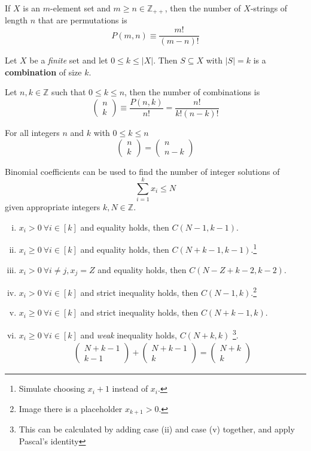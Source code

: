 \documentclass{article}
\def\Z{{\mathbb Z}}
\newcommand{\bi}[2]{\begin{pmatrix}{#1}\\{#2}\end{pmatrix}}
\begin{document}
			\begin{proposition}
				If $X$ is an $m$-element set and $m \geq n \in \Z_{++}$, then the number of $X$-strings of length $n$ that are permutations is 
				\begin{equation}
					P(m, n) \equiv \frac{m!}{(m-n)!}
				\end{equation}
			\end{proposition}
			
			\begin{definition}
				Let $X$ be a \emph{finite} set and let $0 \leq k \leq |X|$. Then $S \subseteq X$ with $|S| = k$ is a \textbf{combination} of size $k$.
			\end{definition}
			
			\begin{proposition}
				Let $n, k \in \Z$ such that $0 \leq k \leq n$, then the number of combinations is
				\begin{equation}
					\bi{n}{k} \equiv \frac{P(n, k)}{n!} = \frac{n!}{k!(n-k)!}
				\end{equation}
			\end{proposition}
			
			\begin{proposition}
				For all integers $n$ and $k$ with $0 \leq k \leq n$
				\begin{equation}
					\bi{n}{k} = \bi{n}{n-k}
				\end{equation}
			\end{proposition}
			
			\begin{example}
				Binomial coefficients can be used to find the number of integer solutions of
				\begin{equation}
					\sum_{i=1}^k x_i \leq N
				\end{equation}
				given appropriate integers $k, N \in \Z$.
				\begin{enumerate}[(i)]
					\item $x_i > 0\ \forall i \in [k]$ and equality holds, then $C(N-1, k-1)$.
					\item $x_i \geq 0\ \forall i \in [k]$ and equality holds, then $C(N+k-1, k-1)$.\footnote{Simulate choosing $x_i + 1$ instead of $x_i$.}
					\item $x_i > 0\ \forall i \neq j, x_j = Z$ and equality holds, then $C(N-Z+k-2,k-2)$.
					\item $x_i > 0\ \forall i \in [k]$ and strict inequality holds, then $C(N-1, k)$.\footnote{Image there is a placeholder $x_{k+1} > 0$.}
					\item $x_i \geq 0\ \forall i \in [k]$ and strict inequality holds, then $C(N+k-1, k)$.
					\item $x_i \geq 0\ \forall i \in [k]$ and \emph{weak} inequality holds, $C(N+k, k)$ \footnote{This can be calculated by adding case (ii) and case (v) together, and apply Pascal's identity}.
					\begin{gather}
						\bi{N+k-1}{k-1} + \bi{N+k-1}{k} = \bi{N+k}{k}
					\end{gather}
				\end{enumerate}
			\end{example}
			
\end{document}

